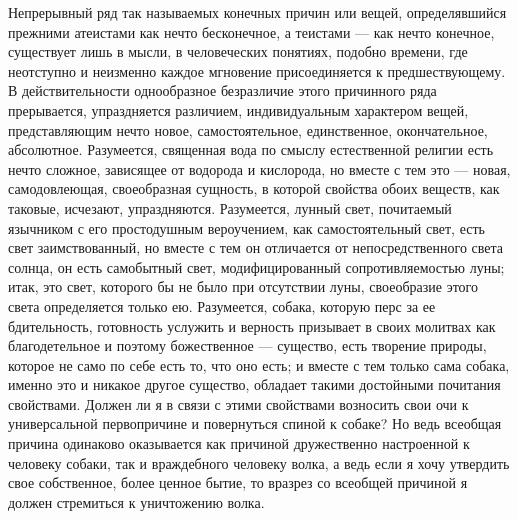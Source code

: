 \documentclass[12pt,oneside]{book}
\begin{document}
Непрерывный ряд так называемых конечных причин или вещей, определявшийся прежними атеистами как нечто бесконечное, а теистами --- как нечто конечное, существует лишь в мысли, в человеческих понятиях, подобно времени, где неотступно и неизменно каждое мгновение присоединяется к предшествующему. В действительности однообразное безразличие этого причинного ряда прерывается, упраздняется различием, индивидуальным характером вещей, представляющим нечто новое, самостоятельное, единственное, окончательное, абсолютное. Разумеется, священная вода по смыслу естественной религии есть нечто сложное, зависящее от водорода и кислорода, но вместе с тем это --- новая, самодовлеющая, своеобразная сущность, в которой свойства обоих веществ, как таковые, исчезают, упраздняются. Разумеется, лунный свет, почитаемый язычником с его простодушным вероучением, как самостоятельный свет, есть свет заимствованный, но вместе с тем он отличается от непосредственного света солнца, он есть самобытный свет, модифицированный сопротивляемостью луны; итак, это свет, которого бы не было при отсутствии луны, своеобразие этого света определяется только ею. Разумеется, собака, которую перс за ее бдительность, готовность услужить и верность призывает в своих молитвах как благодетельное и поэтому божественное --- существо, есть творение природы, которое не само по себе есть то, что оно есть; и вместе с тем только сама собака, именно это и никакое другое существо, обладает такими достойными почитания свойствами. Должен ли я в связи с этими свойствами возносить свои очи к универсальной первопричине и повернуться спиной к собаке? Но ведь всеобщая причина одинаково оказывается как причиной дружественно настроенной к человеку собаки, так и враждебного человеку волка, а ведь если я хочу утвердить свое собственное, более ценное бытие, то вразрез со всеобщей причиной я должен стремиться к уничтожению волка.



\chapter{}
\end{document}
